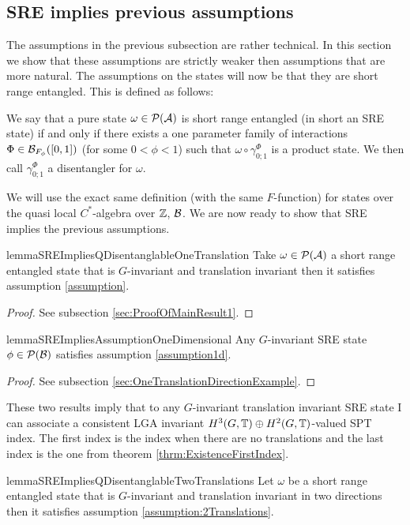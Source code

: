 \documentclass[12pt,a4paper,twoside]{article}
\numberwithin{equation}{section}
\begin{document}
\subsection{SRE implies previous assumptions}\label{sec:Results_1}
The assumptions in the previous subsection are rather technical. In this section we show that these assumptions are strictly weaker then assumptions that are more natural. The assumptions on the states will now be that they are short range entangled. This is defined as follows:
\begin{definition}\label{def:sre}
	We say that a pure state $\omega\in\mathcal P(\mathcal A)$ is short range entangled (in short an SRE state) if and only if there exists a one parameter family of interactions $\Phi\in\mathcal B_{F_\phi}([0,1])$ (for some $0<\phi<1$) such that $\omega\circ\gamma^{\Phi}_{0;1}$ is a product state. We then call $\gamma^{\Phi}_{0;1}$ a disentangler for $\omega$.
\end{definition}
We will use the exact same definition (with the same $F$-function) for states over the quasi local $C^*$-algebra over $\mathbb Z$, $\mathcal B$. We are now ready to show that SRE implies the previous assumptions.
\begin{restatable}{lemma}{SREImpliesQDisentanglableOneTranslation}\label{lem:SRE_Implies_QDisentanglable_OneTranslation}
	Take $\omega\in\mathcal P(\mathcal A)$ a short range entangled state that is $G$-invariant and translation invariant then it satisfies assumption \ref{assumption}.
\end{restatable}
\begin{proof}
	See subsection \ref{sec:ProofOfMainResult1}.
\end{proof}
\begin{restatable}{lemma}{SREImpliesAssumptionOneDimensional}\label{lem:SRE_Implies_Assumption_1d}
	Any $G$-invariant SRE state $\phi\in\mathcal P(\mathcal B)$ satisfies assumption \ref{assumption1d}.
\end{restatable}
\begin{proof}
	See subsection \ref{sec:OneTranslationDirectionExample}.
\end{proof}
These two results imply that to any $G$-invariant translation invariant SRE state I can associate a consistent LGA invariant $H^3(G,\mathbb T)\oplus H^2(G,\mathbb T)$-valued SPT index. The first index is the index when there are no translations and the last index is the one from theorem \ref{thrm:ExistenceFirstIndex}.
\begin{restatable}{lemma}{SREImpliesQDisentanglableTwoTranslations}\label{lem:SRE_Implies_QDisentanglable_TwoTranslations}
	Let $\omega$ be a short range entangled state that is $G$-invariant and translation invariant in two directions then it satisfies assumption \ref{assumption:2Translations}.
\end{restatable}
\end{document}
